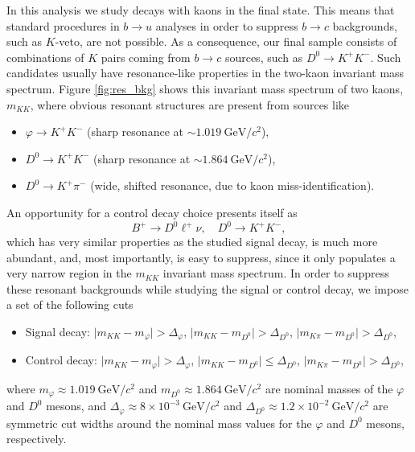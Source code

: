 \documentclass[oneside,a4paper,openany,12pt]{scrbook}
\newcommand {\e}[1]{\mathrm{~#1}}
\newcommand {\E}[1]{\times 10^{#1}}
\begin{document}
In this analysis we study decays with kaons in the final state. This means that standard procedures in $b \to u$ analyses in order to suppress $b \to c$ backgrounds, such as $K$-veto, are not possible. As a consequence, our final sample consists of combinations of $K$ pairs coming from $b \to c$  sources, such as $D^0 \to K^+ K^-$. Such candidates usually have resonance-like properties in the two-kaon invariant mass spectrum. Figure \ref{fig:res_bkg} shows this invariant mass spectrum of two kaons, $m_{KK}$, where obvious resonant structures are present from sources like
\begin{itemize}
\item $\varphi \to K^+K^-$ (sharp resonance at $\sim1.019\e{GeV}/c^2$),
\item $D^0 \to K^+K^-$ (sharp resonance at $\sim 1.864\e{GeV}/c^2$),
\item $D^0 \to K^+ \pi^-$ (wide, shifted resonance, due to kaon miss-identification).
\end{itemize}

An opportunity for a control decay choice presents itself as $$B^+ \to D^0 \ell^+ \nu, \quad D^0 \to K^+ K^-,$$ which has very similar properties as the studied signal decay, is much more abundant, and, most importantly, is easy to suppress, since it only populates a very narrow region in the $m_{KK}$ invariant mass spectrum. In order to suppress these resonant backgrounds while studying the signal or control decay, we impose a set of the following cuts

\begin{itemize}
\item Signal decay: $\vert m_{KK} - m_{\varphi} \vert > \Delta_\varphi$, $\vert m_{KK} - m_{D^0} \vert > \Delta_{D^0}$, $\vert m_{K\pi} - m_{D^0} \vert > \Delta_{D^0}$,
\item Control decay: $\vert m_{KK} - m_{\varphi} \vert > \Delta_\varphi$, $\vert m_{KK} - m_{D^0} \vert \leq \Delta_{D^0}$, $\vert m_{K\pi} - m_{D^0} \vert > \Delta_{D^0}$,
\end{itemize}

where $m_\varphi \approx 1.019\e{GeV}/c^2$ and $m_{D^0} \approx 1.864\e{GeV}/c^2$ are nominal masses of the $\varphi$ and $D^0$ mesons, and $\Delta_\varphi \approx 8\E{-3}\e{GeV}/c^2$ and $\Delta_{D^0} \approx 1.2\E{-2}\e{GeV}/c^2$ are symmetric cut widths around the nominal mass values for the $\varphi$ and $D^0$ mesons, respectively.
\end{document}

